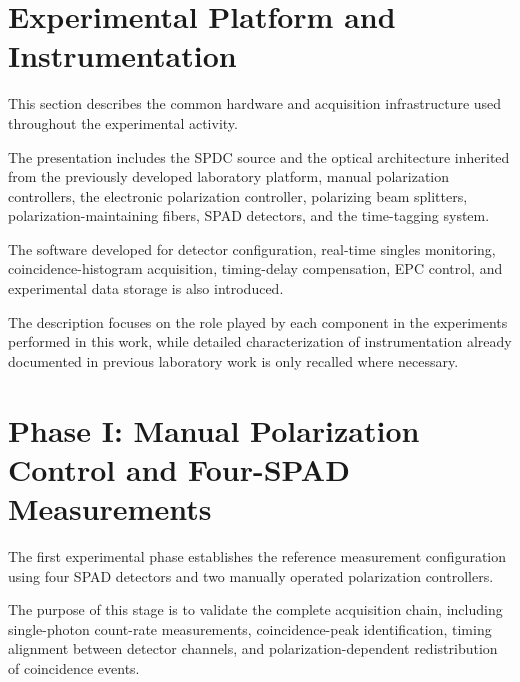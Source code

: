 
\section{Experimental Platform and Instrumentation}
\label{sec:experimental_platform}

This section describes the common hardware and acquisition infrastructure used
throughout the experimental activity.

The presentation includes the SPDC source and the optical architecture inherited
from the previously developed laboratory platform, manual polarization
controllers, the electronic polarization controller, polarizing beam splitters,
polarization-maintaining fibers, SPAD detectors, and the time-tagging system.

The software developed for detector configuration, real-time singles monitoring,
coincidence-histogram acquisition, timing-delay compensation, EPC control, and
experimental data storage is also introduced.

The description focuses on the role played by each component in the experiments
performed in this work, while detailed characterization of instrumentation already
documented in previous laboratory work is only recalled where necessary.



\section{Phase I: Manual Polarization Control and Four-SPAD Measurements}
\label{sec:phase1_manual_control}

The first experimental phase establishes the reference measurement configuration
using four SPAD detectors and two manually operated polarization controllers.

The purpose of this stage is to validate the complete acquisition chain, including
single-photon count-rate measurements, coincidence-peak identification, timing
alignment between detector channels, and polarization-dependent redistribution
of coincidence events.

